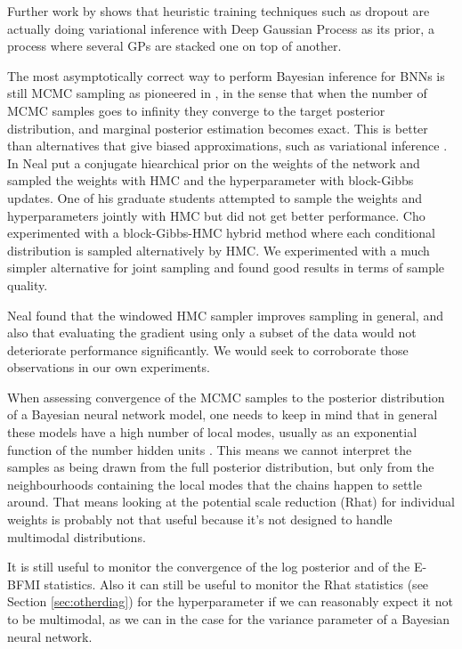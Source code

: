 \documentclass[12pt]{report}
\begin{document}
Further work by \cite{gal2015dropout} shows that heuristic training techniques such as dropout \cite{srivastava2014dropout}  are actually doing variational inference with Deep Gaussian Process \cite{damianou2013deep} as its prior, a process where several GPs are stacked one on top of another. 

The most asymptotically correct way to perform Bayesian inference for BNNs is still MCMC sampling as pioneered in \cite{neal2012bayesian}, in the sense that when the number of MCMC samples goes to infinity they converge to the target posterior distribution, and marginal posterior estimation becomes exact. This is better than alternatives that give biased approximations, such as variational inference \cite{graves2011practical}. In \cite{neal2012bayesian} Neal put a conjugate hiearchical prior on the weights of the network and sampled the weights with HMC and the hyperparameter with block-Gibbs updates. One of his graduate students attempted to sample the weights and hyperparameters jointly with HMC but did not get better performance. Cho \cite{choo2000learning} experimented with a block-Gibbs-HMC hybrid method where each conditional distribution is sampled alternatively by HMC. We experimented with a much simpler alternative for joint sampling and found good results in terms of sample quality. 


Neal found that the windowed HMC sampler improves sampling in general, and also that evaluating the gradient using only a subset of the data would not deteriorate performance significantly. We would seek to corroborate those observations in our own experiments.

When assessing convergence of the MCMC samples to the posterior distribution of a Bayesian neural network model, one needs to keep in mind that in general these models have a high number of local modes, usually as an exponential function of the number hidden units \cite{bishop1995neural}. This means we cannot interpret the samples as being drawn from the full posterior distribution, but only from the neighbourhoods containing the local modes that the chains happen to settle around. That means looking at the potential scale reduction (Rhat) for individual weights is probably not that useful because it's not designed to handle multimodal distributions.  

It is still useful to monitor the convergence of the log posterior and of the E-BFMI statistics. Also it can still be useful to monitor the Rhat statistics (see Section \ref{sec:otherdiag}) for the hyperparameter if we can reasonably expect it not to be multimodal, as we can in the case for the variance parameter of a Bayesian neural network.
\end{document}
